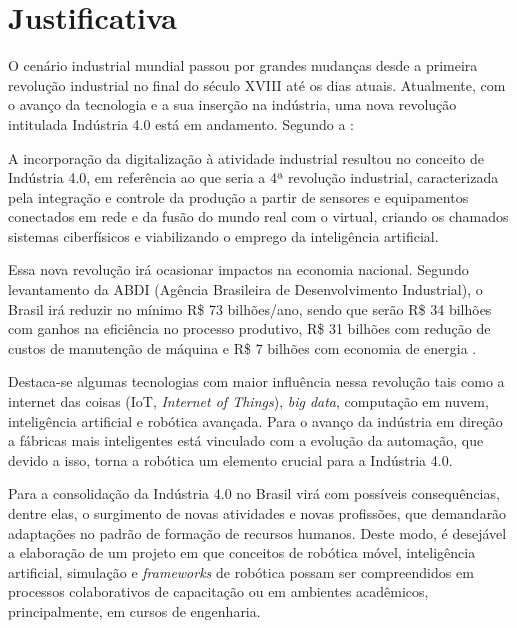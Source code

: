 \section{Justificativa}
\label{sec:justificativa}
O cenário industrial mundial passou por grandes mudanças desde a primeira revolução industrial no final do século XVIII até os dias atuais. Atualmente, com o avanço da tecnologia e a sua inserção na indústria, uma nova revolução intitulada Indústria 4.0 está em andamento. Segundo a :
\begin{quoting}[rightmargin=0cm,leftmargin=4cm]
\begin{singlespace}
{\footnotesize
A incorporação da digitalização à atividade industrial resultou no conceito de Indústria 4.0, em referência ao que seria a 4ª revolução industrial, caracterizada pela integração e controle da produção a partir de sensores e equipamentos conectados em rede e da fusão do mundo real com o virtual, criando os chamados sistemas ciberfísicos e viabilizando o emprego da inteligência artificial.
}
\end{singlespace}
\end{quoting}

Essa nova revolução irá ocasionar impactos na economia nacional. Segundo levantamento da ABDI (Agência Brasileira de Desenvolvimento Industrial), o Brasil irá reduzir no mínimo R\$ 73 bilhões/ano, sendo que serão R\$ 34 bilhões com ganhos na eficiência no processo produtivo, R\$ 31 bilhões com redução de custos de manutenção de máquina e  R\$ 7 bilhões com economia de energia \cite{abdi}.

Destaca-se algumas tecnologias com maior influência nessa revolução tais como a internet das coisas (IoT, \textit{Internet of Things}), \textit{big data}, computação em nuvem, inteligência artificial e robótica avançada. Para  o avanço da indústria em direção a fábricas mais inteligentes está vinculado com a evolução da automação, que devido a isso, torna a robótica um elemento crucial para a Indústria 4.0.

Para  a consolidação da Indústria 4.0 no Brasil virá com possíveis consequências, dentre elas, o surgimento de novas atividades e novas profissões, que demandarão adaptações no padrão de formação de recursos humanos. Deste modo, é desejável a elaboração de um projeto em que conceitos de robótica móvel, inteligência artificial, simulação e \textit{frameworks} de robótica possam ser compreendidos em processos colaborativos de capacitação ou em ambientes acadêmicos, principalmente, em cursos de engenharia.       


